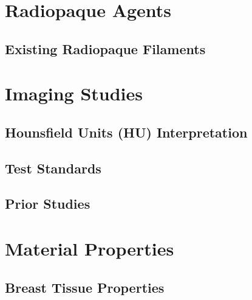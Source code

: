 \section{Radiopaque Agents\label{sec:literatureReview:radiopacity}}

\subsection{Existing Radiopaque Filaments\label{sec:literatureReview:radiopacity:filaments}}

\section{Imaging Studies\label{sec:literatureReview:imaging}}

\subsection{Hounsfield Units (HU) Interpretation\label{sec:literatureReview:imaging:HU}}

\subsection{Test Standards\label{sec:literatureReview:imaging:standards}}

\subsection{Prior Studies\label{sec:literatureReview:imaging:priorStudies}}

\section{Material Properties\label{sec:literatureReview:materialProperties}}

\subsection{Breast Tissue Properties\label{sec:literatureReview:materialProperties:breast}}

